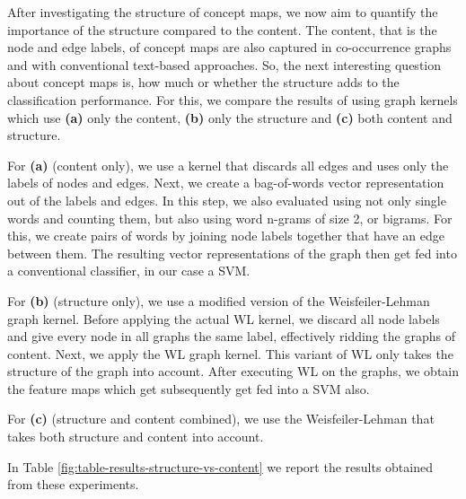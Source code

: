 After investigating the structure of concept maps, we now aim to quantify the importance of the structure compared to the content.
The content, that is the node and edge labels, of concept maps are also captured in co-occurrence graphs and with conventional text-based approaches. So, the next interesting question about concept maps is, how much or whether the structure adds to the classification performance.
For this, we compare the results of using graph kernels which use \textbf{(a)} only the content, \textbf{(b)} only the structure and \textbf{(c)} both content and structure.

For \textbf{(a)} (content only), we use a kernel that discards all edges and uses only the labels of nodes and edges. Next, we create a bag-of-words vector representation out of the labels and edges.
In this step, we also evaluated using not only single words and counting them, but also using word n-grams of size 2, or bigrams.
For this, we create pairs of words by joining node labels together that have an edge between them.
The resulting vector representations of the graph then get fed into a conventional classifier, in our case a SVM.

For \textbf{(b)} (structure only), we use a modified version of the Weisfeiler-Lehman graph kernel. Before applying the actual WL kernel, we discard all node labels and give every node in all graphs the same label, effectively ridding the graphs of content. Next, we apply the WL graph kernel. This variant of WL only takes the structure of the graph into account.
After executing WL on the graphs, we obtain the feature maps which get subsequently get fed into a SVM also.

For \textbf{(c)} (structure and content combined), we use the Weisfeiler-Lehman that takes both structure and content into account.

In Table \ref{fig:table-results-structure-vs-content} we report the results obtained from these experiments.

